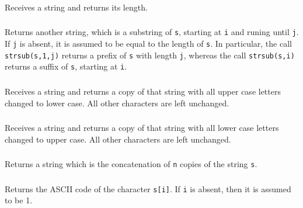 \subsubsection*{}
Receives a string and returns its length.

\subsubsection*{}
Returns another string, which is a substring of \verb's',
starting at \verb'i'  and runing until \verb'j'.
If \verb'j' is absent,
it is assumed to be equal to the length of \verb's'.
In particular, the call \verb'strsub(s,1,j)' returns a prefix of \verb's'
with length \verb'j',
whereas the call \verb'strsub(s,i)' returns a suffix of \verb's',
starting at \verb'i'.

\subsubsection*{}
Receives a string and returns a copy of that string with all
upper case letters changed to lower case.
All other characters are left unchanged.

\subsubsection*{}
Receives a string and returns a copy of that string with all
lower case letters changed to upper case.
All other characters are left unchanged.

\subsubsection*{}
Returns a string which is the concatenation of \verb-n- copies of
the string \verb-s-.

\subsubsection*{}
Returns the ASCII code of the character \verb's[i]'.
If \verb'i' is absent, then it is assumed to be 1.

